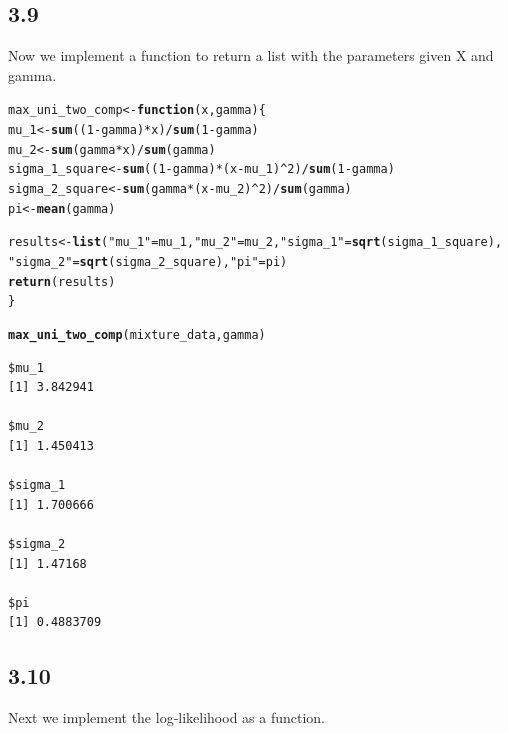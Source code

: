\documentclass[10pt, a4paper, english]{article}\usepackage[]{graphicx}\usepackage[dvipsnames]{xcolor}
\makeatletter
\newcommand{\hlnum}[1]{\textcolor[rgb]{0.686,0.059,0.569}{#1}}%
\newcommand{\hlstr}[1]{\textcolor[rgb]{0.192,0.494,0.8}{#1}}%
\newcommand{\hlopt}[1]{\textcolor[rgb]{0,0,0}{#1}}%
\newcommand{\hlstd}[1]{\textcolor[rgb]{0.345,0.345,0.345}{#1}}%
\newcommand{\hlkwa}[1]{\textcolor[rgb]{0.161,0.373,0.58}{\textbf{#1}}}%
\newcommand{\hlkwb}[1]{\textcolor[rgb]{0.69,0.353,0.396}{#1}}%
\newcommand{\hlkwc}[1]{\textcolor[rgb]{0.333,0.667,0.333}{#1}}%
\newcommand{\hlkwd}[1]{\textcolor[rgb]{0.737,0.353,0.396}{\textbf{#1}}}%
\newenvironment{kframe}{%
 \def\at@end@of@kframe{}%
 \ifinner\ifhmode%
  \def\at@end@of@kframe{\end{minipage}}%
  \begin{minipage}{\columnwidth}%
 \fi\fi%
 \def\FrameCommand##1{\hskip\@totalleftmargin \hskip-\fboxsep
 \colorbox{shadecolor}{##1}\hskip-\fboxsep
     \hskip-\linewidth \hskip-\@totalleftmargin \hskip\columnwidth}%
 \MakeFramed {\advance\hsize-\width
   \@totalleftmargin\z@ \linewidth\hsize
   \@setminipage}}%
 {\par\unskip\endMakeFramed%
 \at@end@of@kframe}
\newenvironment{knitrout}{}{} %
\makeatother
\begin{document}
\subsection{3.9}
Now we implement a function to return a list with the parameters given X and gamma.

\begin{knitrout}
\color{fgcolor}\begin{kframe}
\begin{alltt}
\hlstd{max_uni_two_comp} \hlkwb{<-} \hlkwa{function}\hlstd{(}\hlkwc{x}\hlstd{,} \hlkwc{gamma}\hlstd{)\{}
  \hlstd{mu_1} \hlkwb{<-} \hlkwd{sum}\hlstd{((}\hlnum{1}\hlopt{-}\hlstd{gamma)}\hlopt{*}\hlstd{x)} \hlopt{/} \hlkwd{sum}\hlstd{(}\hlnum{1}\hlopt{-}\hlstd{gamma)}
  \hlstd{mu_2} \hlkwb{<-} \hlkwd{sum}\hlstd{(gamma}\hlopt{*}\hlstd{x)} \hlopt{/} \hlkwd{sum}\hlstd{(gamma)}
  \hlstd{sigma_1_square} \hlkwb{<-} \hlkwd{sum} \hlstd{( (}\hlnum{1}\hlopt{-}\hlstd{gamma)} \hlopt{*} \hlstd{(x}\hlopt{-}\hlstd{mu_1)}\hlopt{^}\hlnum{2} \hlstd{)} \hlopt{/} \hlkwd{sum}\hlstd{(}\hlnum{1}\hlopt{-}\hlstd{gamma)}
  \hlstd{sigma_2_square} \hlkwb{<-} \hlkwd{sum}\hlstd{( gamma}\hlopt{*}\hlstd{(x}\hlopt{-}\hlstd{mu_2)}\hlopt{^}\hlnum{2} \hlstd{)} \hlopt{/} \hlkwd{sum}\hlstd{(gamma)}
  \hlstd{pi} \hlkwb{<-} \hlkwd{mean}\hlstd{(gamma)}

  \hlstd{results} \hlkwb{<-} \hlkwd{list}\hlstd{(}\hlstr{"mu_1"}\hlstd{= mu_1,} \hlstr{"mu_2"}\hlstd{=mu_2,} \hlstr{"sigma_1"}\hlstd{=} \hlkwd{sqrt}\hlstd{(sigma_1_square),}
                  \hlstr{"sigma_2"}\hlstd{=} \hlkwd{sqrt}\hlstd{(sigma_2_square),} \hlstr{"pi"}\hlstd{=pi)}
  \hlkwd{return}\hlstd{(results)}
\hlstd{\}}

\hlkwd{max_uni_two_comp}\hlstd{(mixture_data, gamma)}
\end{alltt}
\begin{verbatim}
$mu_1
[1] 3.842941

$mu_2
[1] 1.450413

$sigma_1
[1] 1.700666

$sigma_2
[1] 1.47168

$pi
[1] 0.4883709
\end{verbatim}
\end{kframe}
\end{knitrout}


\subsection{3.10}
Next we implement the log-likelihood as a function.
\end{document}
